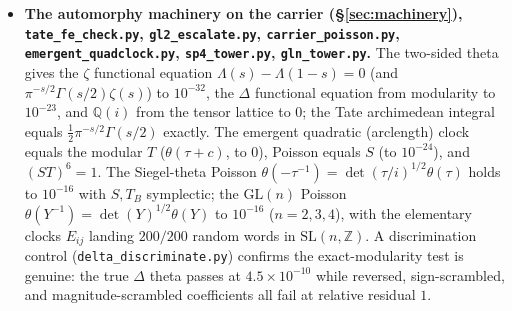 \documentclass[11pt]{article}
\theoremstyle{definition}
\begin{document}
\begin{itemize}
\item \textbf{The automorphy machinery on the carrier (\S\ref{sec:machinery}),
\texttt{tate\_fe\_check.py}, \texttt{gl2\_escalate.py}, \texttt{carrier\_poisson.py},
\texttt{emergent\_quadclock.py}, \texttt{sp4\_tower.py}, \texttt{gln\_tower.py}.} The two-sided theta
gives the $\zeta$ functional equation $\Lambda(s)-\Lambda(1-s)=0$ (and $\pi^{-s/2}\Gamma(s/2)\zeta(s)$)
to $10^{-32}$, the $\Delta$ functional equation from modularity to $10^{-23}$, and $\mathbb Q(i)$ from
the tensor lattice to $0$; the Tate archimedean integral equals $\tfrac12\pi^{-s/2}\Gamma(s/2)$
exactly. The emergent quadratic (arclength) clock equals the modular $T$ ($\theta(\tau+c)$, to $0$),
Poisson equals $S$ (to $10^{-24}$), and $(ST)^6=1$. The Siegel-theta Poisson $\theta(-\tau^{-1})=
\det(\tau/i)^{1/2}\theta(\tau)$ holds to $10^{-16}$ with $S,T_B$ symplectic; the $\mathrm{GL}(n)$
Poisson $\theta(Y^{-1})=\det(Y)^{1/2}\theta(Y)$ to $10^{-16}$ ($n=2,3,4$), with the elementary clocks
$E_{ij}$ landing $200/200$ random words in $\mathrm{SL}(n,\mathbb Z)$. A discrimination control
(\texttt{delta\_discriminate.py}) confirms the exact-modularity test is genuine: the true $\Delta$
theta passes at $4.5\times10^{-10}$ while reversed, sign-scrambled, and magnitude-scrambled
coefficients all fail at relative residual $1$.
\end{itemize}
\end{document}

